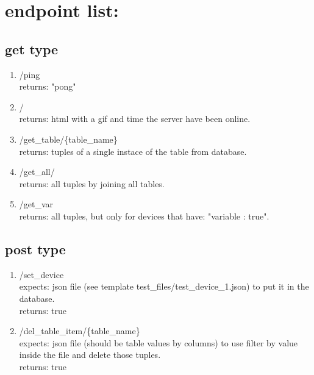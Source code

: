 \documentclass{article}
\begin{document}
\section*{endpoint list:}
\subsection*{get type}
\begin{enumerate}
    \item /ping \\ returns: "pong"
    \item / \\ returns: html with a gif and time the server have been online.
    \item /get\_table/\{table\_name\} \\ returns: tuples of a single instace of the table from database.
    \item /get\_all/ \\ returns: all tuples by joining all tables.
    \item /get\_var \\ returns: all tuples, but only for devices that have: "variable : true".
\end{enumerate}

\subsection*{post type}
\begin{enumerate}
    \item /set\_device \\ expects: json file (see template test\_files/test\_device\_1.json) to put it in the database.\\ returns: true 
    \item /del\_table\_item/\{table\_name\} \\ expects: json file (should be table values by columns) to use filter by value inside the file and delete those tuples.\\ returns: true
\end{enumerate}
\end{document}
